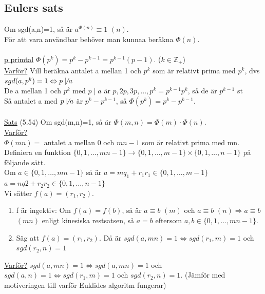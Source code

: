 \documentclass{article}
\begin{document}
    \subsection{Eulers sats}
    Om sgd(a,n)=1, så är $a^{\Phi (n)}\equiv 1$ $(n)$.\\
    För att vara användbar behöver man kunnaa beräkna $\Phi (n)$.\\\\
    \underline{p primtal} $\Phi (p^{k})=p^{k}-p^{k-1}=p^{k-1}(p-1)$. ($k\in \mathbb{Z_{+}}$)\\
    \underline{Varför?} Vill beräkna antalet a mellan 1 och $p^{k}$ som är relativt prima med $p^{k}$, dvs $sgd(a,p^{k})=1\Leftrightarrow p \not \mid a$\\
    \indent De a mellan 1 och $p^{k}$ med $p\mid a$ är $p,2p,3p,\ldots,p^{k}=p^{k-1}p^{k}$, så de är $p^{k-1}$ st\\
    Så antalet a med $p\not \mid a$ är $p^{k}-p^{k-1}$, så $\Phi (p^{k})=p^{k}-p^{k-1}$.\\\\
    \underline{Sats} (5.54) Om sgd(m,n)=1, så är $\Phi (m,n)=\Phi (m) \cdot \Phi (n)$.\\
    \underline{Varför?}\\
    $\Phi (mn)=$ antalet a mellan 0 och $mn-1$ som är relativt prima med mn.\\
    Definiera en funktion $\{0,1,\ldots,mn-1\}\rightarrow\{0,1,\ldots,m-1\}\times \{0,1,\ldots, n-1\}$ på följande sätt. \\
    Om $a\in\{0,1,\ldots,mn-1\}$ så är \indent $a=mq_{1}+r_{1}$\indent $r_{1}\in\{0,1,\ldots,m-1\}$\\
    \indent \indent \indent \indent \indent \indent \indent \indent \indent \indent $a=nq{2}+r_{2}$\indent $r_{2}\in\{0,1,\ldots,n-1\}$\\
    Vi sätter $f(a)=(r_{1},r_{2})$.
    \begin{enumerate}
        \item f är ingektiv: Om $f(a)=f(b)$, så är $a\equiv b$ $(m)$ och $a\equiv b$ $(n)\Rightarrow a\equiv b$ $(mn)$ enligt kinesiska restsatsen, så $a=b$ eftersom $a,b\in\{0,1,\ldots,mn-1\}$.
        \item Säg att $f(a)=(r_{1}, r_{2})$. Då är $sgd(a,mn)=1\Leftrightarrow sgd(r_{1},m)=1$ och $sgd(r_{2}, n)=1$
    \end{enumerate}
    \underline{Varför?} $sgd(a,mn)=1\Leftrightarrow sgd(a,mn)=1$ och $sgd(a,n)=1\Leftrightarrow sgd(r_{1},m)=1$ och $sgd(r_{2},n)=1$. (Jämför med motiveringen till varför Euklides algoritm fungerar)\\\\
\end{document}
